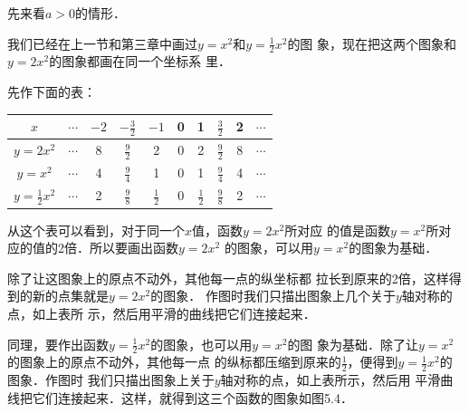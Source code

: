 先来看$a>0$的情形．

我们已经在上一节和第三章中画过$y=x^2$和$y=\frac{1}{2}x^2$的图
象，现在把这两个图象和$y=2x^2$的图象都画在同一个坐标系
里．

先作下面的表：
\begin{center}
\begin{tabular}{c|ccccccccc}
    \hline
$x$ &$\cdots$ & $-2$  & $-\tfrac{3}{2}$  & $-1$   & 0   & 1&$\tfrac{3}{2}$& 2&$\cdots$\\
\hline
$y=2x^2$ &$\cdots$ & 8&$\tfrac{9}{2}$ &2  & 0   & 2&$\tfrac{9}{2}$ &8&$\cdots$\\
$y=x^2$ &$\cdots$ & 4&$\tfrac{9}{4}$&1  & 0   & 1&$\tfrac{9}{4}$&4&$\cdots$\\
$y=\tfrac{1}{2}x^2$ &$\cdots$ & 2 & $\tfrac{9}{8}$&$\tfrac{1}{2}$  & 0   & $\tfrac{1}{2}$  & $\tfrac{9}{8}$&2&$\cdots$\\
\hline
\end{tabular}    
\end{center}

\begin{figure}[htp]
    \centering
{}
    \caption{}
\end{figure}

从这个表可以看到，对于同一个$x$值，函数$y=2x^2$所对应
的值是函数$y=x^2$所对应的值的2倍．所以要画出函数$y=2x^2$
的图象，可以用$y=x^2$的图象为基础．

除了让这图象上的原点不动外，其他每一点的纵坐标都
拉长到原来的2倍，这样得到的新的点集就是$y=2x^2$的图象．
作图时我们只描出图象上几个关于$y$轴对称的点，如上表所
示，然后用平滑的曲线把它们连接起来．

同理，要作出函数$y=\frac{1}{2}x^2$的图象，也可以用$y=x^2$的图
象为基础．除了让$y=x^2$的图象上的原点不动外，其他每一点
的纵标都压缩到原来的$\frac{1}{2}$，便得到$y=\frac{1}{2}x^2$的图象．作图时
我们只描出图象上关于$y$轴对称的点，如上表所示，然后用
平滑曲线把它们连接起来．这样，就得到这三个函数的图象如图5.4．

